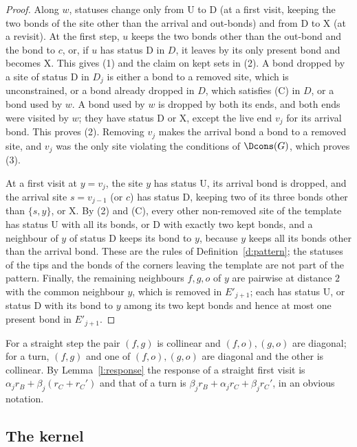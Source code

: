 \begin{proof}
Along $w$, statuses change only from $\mathrm U$ to $\mathrm D$ (at a first visit, keeping the two bonds of the site other than the arrival and out-bonds) and from $\mathrm D$ to $\mathrm X$ (at a revisit). At the first step, $u$ keeps the two bonds other than the out-bond and the bond to $c$, or, if $u$ has status $\mathrm D$ in $D$, it leaves by its only present bond and becomes $\mathrm X$. This gives (1) and the claim on kept sets in (2). A bond dropped by a site of status $\mathrm D$ in $D_j$ is either a bond to a removed site, which is unconstrained, or a bond already dropped in $D$, which satisfies (C) in $D$, or a bond used by $w$. A bond used by $w$ is dropped by both its ends, and both ends were visited by $w$; they have status $\mathrm D$ or $\mathrm X$, except the live end $v_j$ for its arrival bond. This proves (2). Removing $v_j$ makes the arrival bond a bond to a removed site, and $v_j$ was the only site violating the conditions of $\Dcons(G)$, which proves (3).

At a first visit at $y = v_j$, the site $y$ has status $\mathrm U$, its arrival bond is dropped, and the arrival site $s = v_{j - 1}$ (or $c$) has status $\mathrm D$, keeping two of its three bonds other than $\{s, y\}$, or $\mathrm X$. By (2) and (C), every other non-removed site of the template has status $\mathrm U$ with all its bonds, or $\mathrm D$ with exactly two kept bonds, and a neighbour of $y$ of status $\mathrm D$ keeps its bond to $y$, because $y$ keeps all its bonds other than the arrival bond. These are the rules of Definition~\ref{d:pattern}; the statuses of the tips and the bonds of the corners leaving the template are not part of the pattern. Finally, the remaining neighbours $f, g, o$ of $y$ are pairwise at distance $2$ with the common neighbour $y$, which is removed in $E'_{j + 1}$; each has status $\mathrm U$, or status $\mathrm D$ with its bond to $y$ among its two kept bonds and hence at most one present bond in $E'_{j + 1}$.
\end{proof}

For a straight step the pair $(f, g)$ is collinear and $(f, o), (g, o)$ are diagonal; for a turn, $(f, g)$ and one of $(f, o), (g, o)$ are diagonal and the other is collinear. By Lemma~\ref{l:response} the response of a straight first visit is $\alpha_j r_B + \beta_j(r_C + r_C')$ and that of a turn is $\beta_j r_B + \alpha_j r_C + \beta_j r_C'$, in an obvious notation.

\subsection{The kernel}\label{s:kernel}

